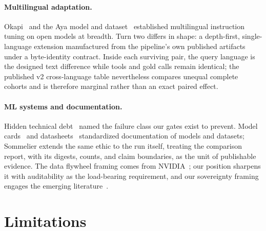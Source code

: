 \documentclass{article}
\newcommand{\sommelier}{Sommelier}
\begin{document}
\paragraph{Multilingual adaptation.}
Okapi~\citep{lai2023okapi} and the Aya model and dataset~\citep{ustun2024aya,singh2024ayadataset} established multilingual instruction tuning on open models at breadth. Turn two differs in shape: a depth-first, single-language extension manufactured from the pipeline's own published artifacts under a byte-identity contract. Inside each surviving pair, the query language is the designed text difference while tools and gold calls remain identical; the published v2 cross-language table nevertheless compares unequal complete cohorts and is therefore marginal rather than an exact paired effect.

\paragraph{ML systems and documentation.}
Hidden technical debt~\citep{sculley2015hidden} named the failure class our gates exist to prevent. Model cards~\citep{mitchell2019modelcards} and datasheets~\citep{gebru2021datasheets} standardized documentation of models and datasets; \sommelier{} extends the same ethic to the run itself, treating the comparison report, with its digests, counts, and claim boundaries, as the unit of publishable evidence. The data flywheel framing comes from NVIDIA~\citep{nvidia2026flywheel,arunagiri2025flywheel,verma2025flywheel}; our position sharpens it with auditability as the load-bearing requirement, and our sovereignty framing engages the emerging literature~\citep{singh2025sovereignai,srivastava2024digitalsovereignty,europeanunion2024aiact}.

\section{Limitations}
\label{sec:limitations}
\end{document}
